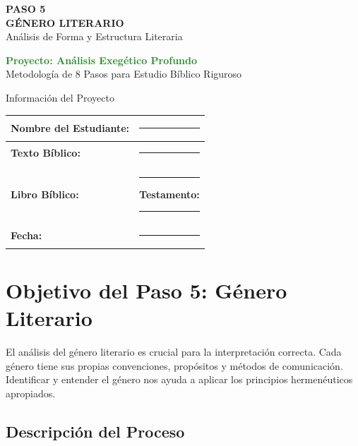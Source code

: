 \documentclass[11pt,a4paper]{article}
\begin{document}
\begin{center}
    {\Huge\color{forestgreen}\textbf{PASO 5}}\\[0.5cm]
    {\Large\color{sagegreen}\textbf{GÉNERO LITERARIO}}\\[0.3cm]
    {\large\color{papergray}Análisis de Forma y Estructura Literaria}\\[1cm]
    
    \begin{tcolorbox}[colback=olivegreen!10, colframe=olivegreen, width=0.8\textwidth]
        \centering
        \textcolor{forestgreen}{\textbf{Proyecto: Análisis Exegético Profundo}}\\
        \textcolor{papergray}{Metodología de 8 Pasos para Estudio Bíblico Riguroso}
    \end{tcolorbox}
\end{center}

\vspace{1cm}

\begin{infobox}{Información del Proyecto}
\begin{tabularx}{\textwidth}{|X|X|}
\hline
\textbf{Nombre del Estudiante:} & \rule{6cm}{0.4pt} \\[0.8cm]
\hline
\textbf{Texto Bíblico:} & \rule{6cm}{0.4pt} \\[0.8cm]
\hline
\textbf{Libro Bíblico:} & \rule{3cm}{0.4pt} \quad \textbf{Testamento:} \rule{2cm}{0.4pt} \\[0.8cm]
\hline
\textbf{Fecha:} & \rule{6cm}{0.4pt} \\[0.8cm]
\hline
\end{tabularx}
\end{infobox}

\section{Objetivo del Paso 5: Género Literario}

El análisis del género literario es crucial para la interpretación correcta. Cada género tiene sus propias convenciones, propósitos y métodos de comunicación. Identificar y entender el género nos ayuda a aplicar los principios hermenéuticos apropiados.

\subsection{Descripción del Proceso}
\end{document}
